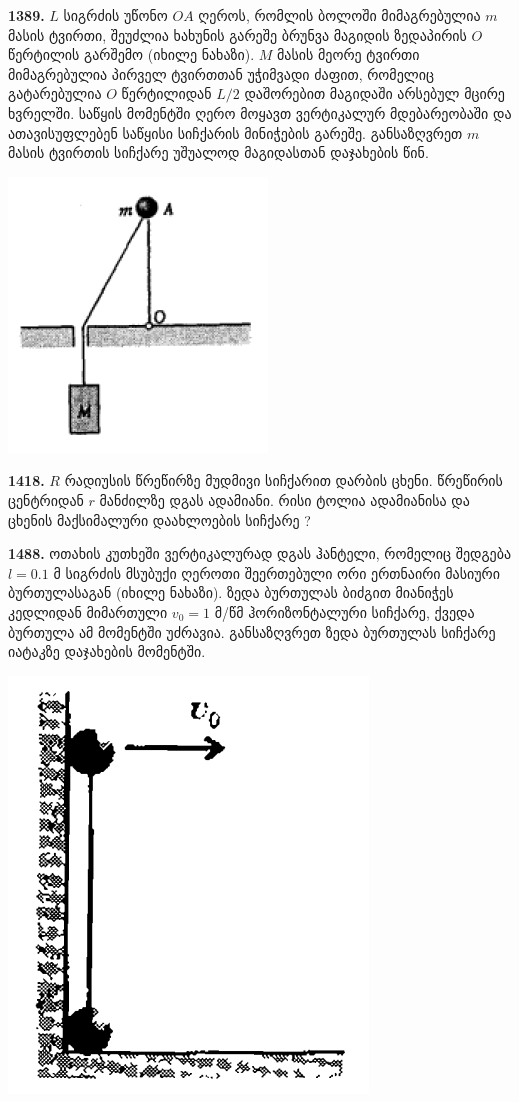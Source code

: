 \documentclass[12pt,a4paper,]{report}
\begin{document}
\textbf{1389.} $L$ სიგრძის უწონო $OA$ ღეროს, რომლის ბოლოში მიმაგრებულია $m$ მასის ტვირთი,  შეუძლია ხახუნის გარეშე ბრუნვა მაგიდის ზედაპირის $O$ წერტილის გარშემო (იხილე ნახაზი). $M$ მასის მეორე ტვირთი მიმაგრებულია პირველ ტვირთთან უჭიმვადი ძაფით, რომელიც გატარებულია $O$ წერტილიდან $L/2$ დაშორებით მაგიდაში არსებულ მცირე ხვრელში. საწყის მომენტში ღერო მოყავთ ვერტიკალურ მდებარეობაში და ათავისუფლებენ საწყისი სიჩქარის მინიჭების გარეშე. განსაზღვრეთ $m$ მასის ტვირთის სიჩქარე უშუალოდ მაგიდასთან დაჯახების წინ.
		\begin{center}
			\includegraphics[scale=0.4]{images/F1389.png}
		\end{center}
	
\textbf{1418.} $R$ რადიუსის წრეწირზე მუდმივი სიჩქარით დარბის ცხენი. წრეწირის ცენტრიდან $r$ მანძილზე დგას ადამიანი. რისი ტოლია ადამიანისა და ცხენის მაქსიმალური დაახლოების სიჩქარე ? 

\textbf{1488.} ოთახის კუთხეში ვერტიკალურად დგას ჰანტელი, რომელიც შედგება $l=0.1$ მ სიგრძის  მსუბუქი ღეროთი შეერთებული ორი ერთნაირი მასიური ბურთულასაგან (იხილე ნახაზი). ზედა ბურთულას ბიძგით მიანიჭეს კედლიდან მიმართული $v_0=1$ მ/წმ ჰორიზონტალური სიჩქარე, ქვედა ბურთულა ამ მომენტში უძრავია. განსაზღვრეთ ზედა ბურთულას სიჩქარე იატაკზე დაჯახების მომენტში.
		\begin{center}
			\includegraphics[scale=0.4]{images/F1488.png}
		\end{center}
	
\end{document}
